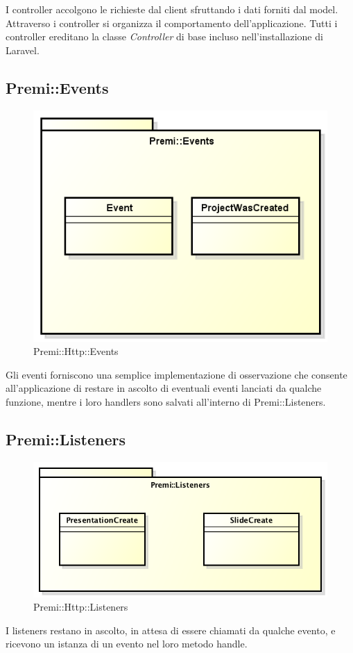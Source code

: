 I controller accolgono le richieste dal client sfruttando i dati forniti dal model. Attraverso i controller si organizza il comportamento dell'applicazione. Tutti i controller ereditano la classe \textit{Controller} di base incluso nell'installazione di \gls{Laravel}.


\newpage
\subsection{Premi::Events}
\begin{figure}[h]
	\centering
	\includegraphics[width=0.7\linewidth]{img/premi_back_end_events}
	\caption[Premi::Events]{Premi::Http::Events}
	\label{fig:premi_back_end_events}
\end{figure}
Gli eventi forniscono una semplice implementazione di osservazione che consente all'applicazione di restare in ascolto di eventuali eventi lanciati da qualche funzione, mentre i loro handlers sono salvati all'interno di Premi::Listeners.


\newpage
\subsection{Premi::Listeners}
\begin{figure}[h]
	\centering
	\includegraphics[width=0.7\linewidth]{img/back_end_premi_listeners}
	\caption[Premi::Http::Listeners]{Premi::Http::Listeners}
	\label{fig:back_end_premi_listeners}
\end{figure}

I listeners restano in ascolto, in attesa di essere chiamati da qualche evento, e ricevono un istanza di un evento nel loro metodo handle.

